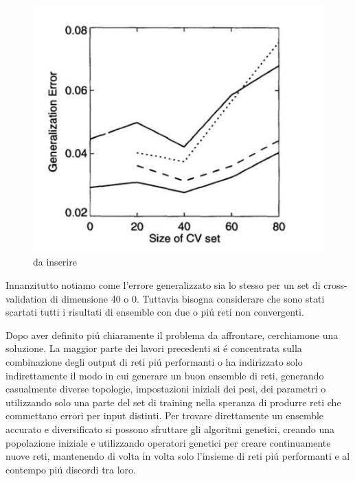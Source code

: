 \documentclass[a4paper,10pt]{article}
\begin{document}
  \begin{figure}[h!]
   \centering
   \includegraphics[scale=0.4]{GenError.png} 
   \caption{da inserire}
   \label{GenErrorpng}
  \end{figure}
  Innanzitutto notiamo come l'errore generalizzato sia lo stesso per un set di cross-validation di dimensione 40 o 0. Tuttavia bisogna considerare che sono stati scartati tutti i risultati di ensemble con due o pi\'u reti non convergenti.

  Dopo aver definito pi\'u chiaramente il problema da affrontare, cerchiamone una soluzione. La maggior parte dei lavori precedenti si \'e concentrata sulla combinazione degli output di reti pi\'u performanti o ha indirizzato solo indirettamente il modo in cui generare un buon ensemble di reti, generando casualmente diverse topologie, impostazioni iniziali dei pesi, dei parametri o utilizzando solo una parte del set di training nella speranza di produrre reti che commettano errori per input distinti. Per trovare direttamente un ensemble accurato e diversificato si possono sfruttare gli algoritmi genetici, creando una popolazione iniziale e utilizzando operatori genetici per creare continuamente nuove reti, mantenendo di volta in volta solo l'insieme di reti pi\'u performanti e al contempo pi\'u discordi tra loro. 
\end{document}
